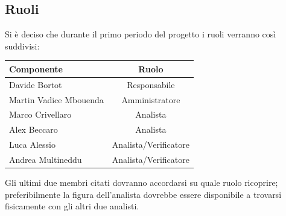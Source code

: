 \documentclass[a4paper,11pt]{article}
\begin{document}
		\subsection{Ruoli}
		Si è deciso che durante il primo periodo del progetto i ruoli verranno così suddivisi:
		\begin{table}[h!]			
		\begin{center}
			\begin{tabular}{l c}
			\textbf{Componente} & \textbf{Ruolo}\\
			\midrule
			Davide Bortot & Responsabile\\
			Martin Vadice Mbouenda & Amministratore\\
			Marco Crivellaro & Analista\\
			Alex Beccaro & Analista\\
			Luca Alessio & Analista/Verificatore\\
			Andrea Multineddu & Analista/Verificatore\\
			\midrule
			\end{tabular}
		\end{center}
		\end{table}
		\newline
		Gli ultimi due membri citati dovranno accordarsi su quale ruolo ricoprire; preferibilmente la figura dell'analista dovrebbe essere disponibile a trovarsi fisicamente con gli altri due analisti.
\end{document}
